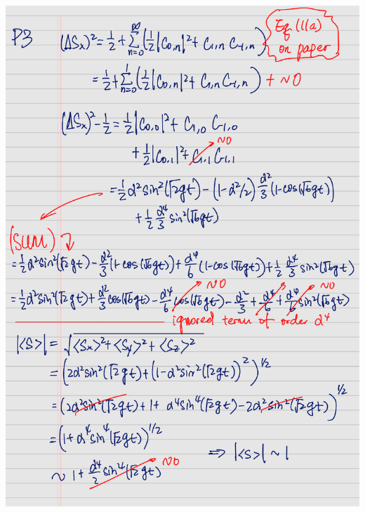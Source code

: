 \documentclass[11pt, oneside]{book}
\theoremstyle{break}
\theoremstyle{break}
\begin{document}
\begin{center}
\includegraphics[scale=0.69, page=2]{542HW7_sketch}
\end{center}
\end{document}
